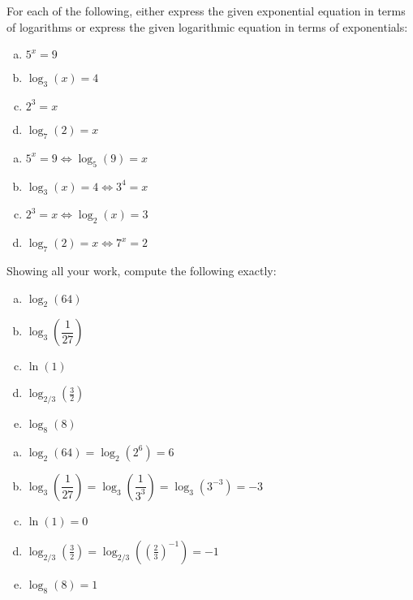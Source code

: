 \documentclass[11pt,letterpaper]{article}
\begin{document}
\newpage



 For each of the following, either express the given exponential equation in terms of logarithms or express the given logarithmic equation in terms of exponentials:
	\begin{enumerate}[(a)]
	\item $5^x= 9$
	\item $\log_3(x)= 4$
	\item $2^3= x$
	\item $\log_7(2)= x$
	\end{enumerate} \pspace

\sol 
\begin{enumerate}[(a)]
\item $5^x= 9 \Longleftrightarrow \log_5(9)= x$ \pspace

\item $\log_3(x)= 4 \Longleftrightarrow 3^4= x$ \pspace

\item $2^3= x \Longleftrightarrow \log_2(x)= 3$ \pspace

\item $\log_7(2)= x \Longleftrightarrow 7^x= 2$
\end{enumerate}



\newpage



 Showing all your work, compute the following exactly:
	\begin{enumerate}[(a)]
	\item $\log_2(64)$
	\item $\log_3 \left( \dfrac{1}{27} \right)$
	\item $\ln(1)$
	\item $\log_{2/3} \left( \frac{3}{2} \right)$
	\item $\log_8(8)$
	\end{enumerate} \pspace

\sol 
\begin{enumerate}[(a)]
\item $\log_2(64)= \log_2(2^6)= 6$ \pspace

\item $\log_3 \left( \dfrac{1}{27} \right)= \log_3 \left( \dfrac{1}{3^3} \right)= \log_3(3^{-3})= -3$ \pspace

\item $\ln(1)= 0$ \pspace

\item $\log_{2/3} \left( \frac{3}{2} \right)= \log_{2/3} \left( \left( \frac{2}{3} \right)^{-1} \right)= -1$ \pspace

\item $\log_8(8)= 1$
\end{enumerate}
\end{document}
